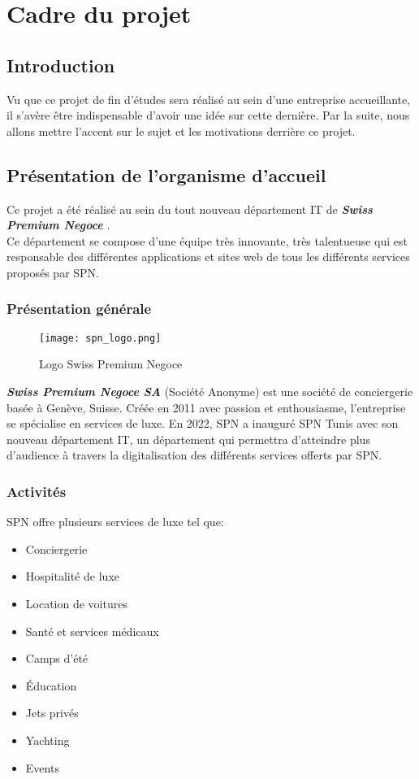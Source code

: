 \chapter{Cadre du projet}
\minitoc
\clearpage
\section*{Introduction}
\small{Vu que ce projet de fin d'études sera réalisé au sein d'une entreprise accueillante, il s'avère être indispensable d'avoir une idée sur cette dernière. Par la suite, nous allons mettre l'accent sur le sujet et les motivations derrière ce projet.}
\section{Présentation de l'organisme d'accueil}
Ce projet a été réalisé au sein du tout nouveau département IT de \textit{\textbf{Swiss Premium Negoce}} \cite{spn}.\\
\noindent Ce département se compose d'une équipe très innovante, très talentueuse qui est responsable des différentes applications et sites web de tous les différents services proposés par SPN.
\subsection{Présentation générale}
\vspace{1cm}
\begin{figure}[H]
    \centering
    \texttt{[image: spn\_logo.png]}
    \vspace{0.5cm}
    \caption{Logo Swiss Premium Negoce}
    \label{fig:spn_logo}
\end{figure}
\vspace{1cm}
\textit{\textbf{Swiss Premium Negoce SA}} (Société Anonyme) est une société de conciergerie basée à
Genève, Suisse. Créée en 2011 avec passion et enthousiasme, l'entreprise se spécialise en services de luxe.
En 2022, SPN a inauguré SPN Tunis avec son nouveau département IT, un département qui permettra d'atteindre plus d'audience à travers la digitalisation des différents services offerts par SPN.
\subsection{Activités}
SPN offre plusieurs services de luxe tel que:
\begin{itemize}
    \item Conciergerie
    \item Hospitalité de luxe
    \item Location de voitures
    \item Santé et services médicaux
    \item Camps d'été
    \item Éducation
    \item Jets privés
    \item Yachting
    \item Events
\end{itemize}
